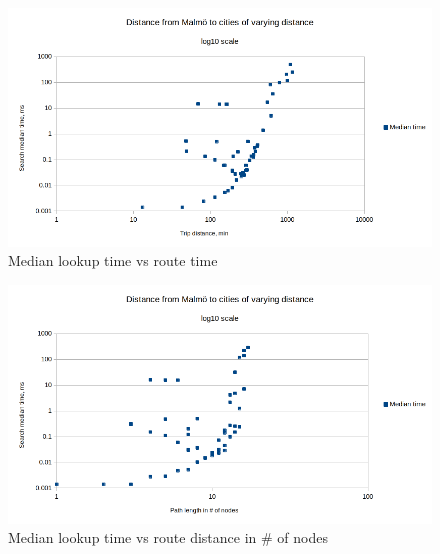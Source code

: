 \documentclass[a4paper,11pt]{article}
\begin{document}
    \begin{figure}[H]
        \centering
        \includegraphics[width=\textwidth]{dists.png}
        \caption{Median lookup time vs route time}
        \label{fig:path-times}
    \end{figure}

    \begin{figure}[H]
        \centering
        \includegraphics[width=\textwidth]{dists-paths.png}
        \caption{Median lookup time vs route distance in \# of nodes}
        \label{fig:path-nodes}
    \end{figure}
\end{document}
